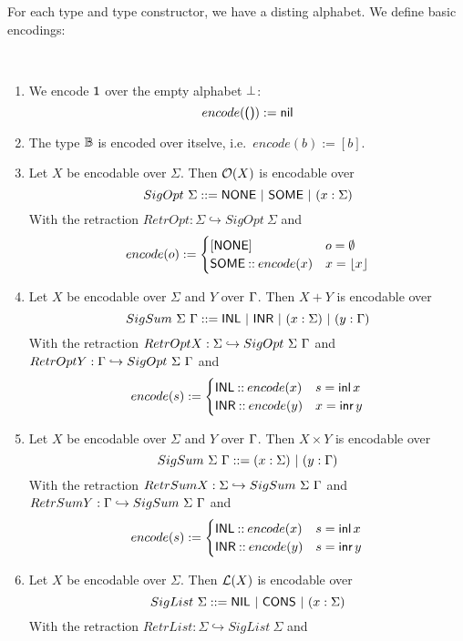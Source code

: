For each type and type constructor, we have a disting alphabet.  We define basic encodings:
\begin{definition}
  \label{def:basic-encodings}
  ~
  \begin{enumerate}
  \item We encode $\textsf{1}$ over the empty alphabet $\bot$:
  \[ encode(\textsf{()}) := \textsf{nil}
  \]
  \item The type $\mathbb{B}$ is encoded over itselve, i.e.\ $encode(b):=[b]$.
  \item Let $X$ be encodable over $\Sigma$.  Then $\mathcal{O}(X)$ is encodable over
    \[ SigOpt~\Sigma ::= \textsf{NONE} ~|~ \textsf{SOME} ~|~ (x:\Sigma) \]
    With the retraction $RetrOpt : \Sigma \hookrightarrow SigOpt~\Sigma$ and
    \[
      encode(o) :=
      \begin{cases}
        [\textsf{NONE}] & o=\emptyset \\
        \textsf{SOME} \mathbin{::} encode(x) & x=\left\lfloor {x} \right\rfloor
      \end{cases}
    \]
  \item Let $X$ be encodable over $\Sigma$ and $Y$ over $\Gamma$.  Then $X+Y$ is encodable over
    \[ SigSum~\Sigma~\Gamma ::= \textsf{INL} ~|~ \textsf{INR} ~|~ (x:\Sigma) ~|~ (y:\Gamma) \] With the retraction
    $RetrOptX : \Sigma \hookrightarrow SigOpt~\Sigma~\Gamma$ and $RetrOptY : \Gamma \hookrightarrow SigOpt~\Sigma~\Gamma$ and
    \[
      encode(s) :=
      \begin{cases}
        \textsf{INL} \mathbin{::} encode(x) & s=\operatorname{\textsf{inl}} x \\
        \textsf{INR} \mathbin{::} encode(y) & x=\operatorname{\textsf{inr}} y
      \end{cases}
    \]
  \item Let $X$ be encodable over $\Sigma$ and $Y$ over $\Gamma$.  Then $X \times Y$ is encodable over
    \[ SigSum~\Sigma~\Gamma ::= (x:\Sigma) ~|~ (y:\Gamma) \] With the retraction
    $RetrSumX : \Sigma \hookrightarrow SigSum~\Sigma~\Gamma$ and \\$RetrSumY : \Gamma \hookrightarrow SigSum~\Sigma~\Gamma$ and
    \[
      encode(s) :=
      \begin{cases}
        \textsf{INL} \mathbin{::} encode(x) & s=\operatorname{\textsf{inl}} x \\
        \textsf{INR} \mathbin{::} encode(y) & s=\operatorname{\textsf{inr}} y
      \end{cases}
    \]
  \item Let $X$ be encodable over $\Sigma$.  Then $\mathcal{L}(X)$ is encodable over
    \[ SigList~\Sigma ::= \textsf{NIL} ~|~ \textsf{CONS} ~|~ (x:\Sigma) \]
    With the retraction $RetrList : \Sigma \hookrightarrow SigList~\Sigma$ and

\end{enumerate}
\end{definition}
